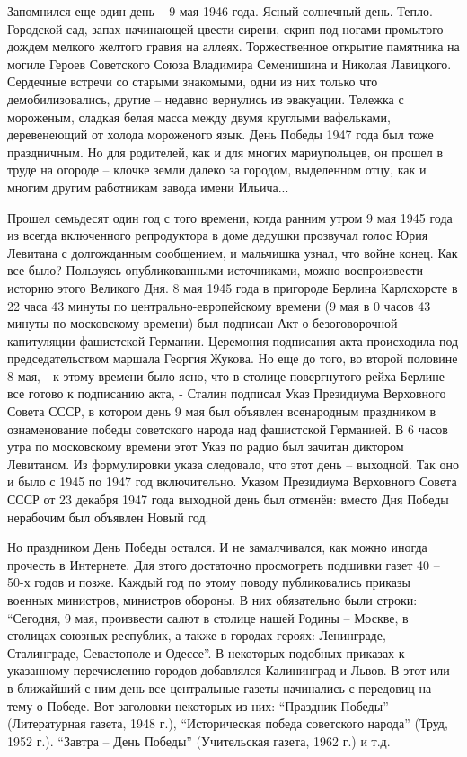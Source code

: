 Запомнился еще один день – 9 мая 1946 года. Ясный солнечный день. Тепло.
Городской сад, запах начинающей цвести сирени, скрип под ногами промытого
дождем мелкого желтого гравия на аллеях. Торжественное открытие памятника на
могиле Героев Советского Союза Владимира Семенишина и Николая Лавицкого.
Сердечные встречи со старыми знакомыми, одни из них только что
демобилизовались, другие – недавно вернулись из эвакуации. Тележка с мороженым,
сладкая белая масса между двумя круглыми вафельками, деревенеющий от холода
мороженого язык. День Победы 1947 года был тоже праздничным. Но для родителей,
как и для многих мариупольцев, он прошел в труде на огороде – клочке земли
далеко за городом, выделенном отцу, как и многим другим работникам завода имени
Ильича... 

Прошел семьдесят один год  с того времени, когда ранним утром 9 мая 1945 года
из всегда включенного репродуктора в доме дедушки прозвучал голос Юрия Левитана
с долгожданным сообщением, и мальчишка  узнал, что войне конец. Как все было?
Пользуясь опубликованными источниками, можно воспроизвести историю этого
Великого Дня.  8 мая 1945 года в пригороде Берлина Карлсхорсте в 22 часа 43
минуты по центрально-европейскому времени (9 мая в 0 часов 43 минуты по
московскому времени) был подписан Акт о безоговорочной капитуляции фашистской
Германии. Церемония подписания акта происходила под председательством маршала
Георгия Жукова. Но еще до того, во второй половине 8 мая, - к этому времени
было ясно, что в столице повергнутого рейха Берлине все готово к подписанию
акта, - Сталин подписал Указ Президиума Верховного Совета СССР, в котором день
9 мая был объявлен всенародным праздником в ознаменование победы советского
народа над фашистской Германией. В 6 часов утра по московскому времени этот
Указ по радио был зачитан диктором Левитаном.  Из формулировки указа следовало,
что этот день – выходной. Так оно и было с 1945 по 1947 год включительно.
Указом Президиума Верховного Совета СССР от 23 декабря 1947 года выходной день
был отменён: вместо Дня Победы нерабочим был объявлен Новый год.

Но праздником День Победы остался. И не замалчивался, как можно иногда прочесть
в Интернете. Для этого достаточно просмотреть подшивки газет 40 – 50-х годов и
позже. Каждый год по этому поводу публиковались приказы военных министров,
министров обороны. В них обязательно были строки: \enquote{Сегодня, 9 мая, произвести
салют в столице нашей Родины – Москве, в столицах союзных республик, а также в
городах-героях: Ленинграде, Сталинграде, Севастополе и Одессе}. В некоторых
подобных приказах к указанному перечислению городов добавлялся Калининград и
Львов. В этот или в ближайший с ним день все центральные газеты начинались с
передовиц на тему о Победе. Вот заголовки некоторых из них: \enquote{Праздник Победы}
(Литературная газета, 1948 г.), \enquote{Историческая победа советского народа} (Труд,
1952 г.). \enquote{Завтра – День Победы} (Учительская газета, 1962 г.) и т.д.

